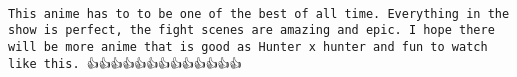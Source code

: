 \documentclass[
]{article}
\begin{document}
\begin{verbatim}
                                                                                                                                                                                                                                                                                                                                                                                                                                                                                                                                                                                                                                                                                                                                                                                                                                                                                                                                                                                                                                                                                                                                                                                                                                                                                                                                                                                                                                                                                                             This anime has to to be one of the best of all time. Everything in the show is perfect, the fight scenes are amazing and epic. I hope there will be more anime that is good as Hunter x hunter and fun to watch like this. 👍👍👍👍👍👍👍👍👍👍👍👍👍

\end{verbatim}
\end{document}
